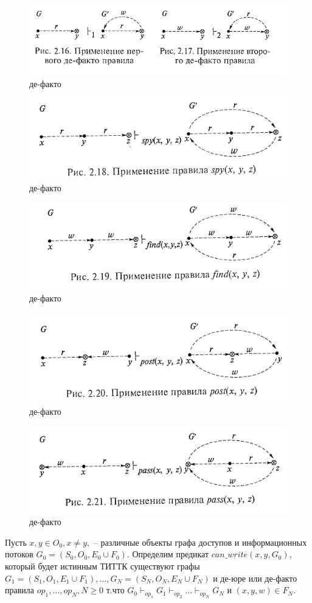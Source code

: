 \begin{figure}[H]
	\centering
	\includegraphics[width=0.5\linewidth]{img/3.png}
	\caption{де-факто}
\end{figure}

\begin{figure}[H]
	\centering
	\includegraphics[width=0.5\linewidth]{img/4.png}
	\caption{де-факто}
\end{figure}

\begin{figure}[H]
	\centering
	\includegraphics[width=0.5\linewidth]{img/5.png}
	\caption{де-факто}
\end{figure}

\begin{figure}[H]
	\centering
	\includegraphics[width=0.5\linewidth]{img/6.png}
	\caption{де-факто}
\end{figure}

\begin{figure}[H]
	\centering
	\includegraphics[width=0.5\linewidth]{img/7.png}
	\caption{де-факто}
\end{figure}

\begin{defs}
	Пусть $x, y \in O_0, x \neq y,$ -- различные объекты графа доступов и информационных потоков $G_0 = (S_0, O_0, E_0 \cup F_0).$
	Определим предикат $can\_write(x, y, G_0)$, который будет истинным ТИТТК существуют графы 
	$G_1 = (S_1, O_1, E_1 \cup F_1), \ldots, G_N = (S_N, O_N, E_N \cup F_N)$ и де-юре или де-факто правила
	$op_1, \ldots, op_N, N \geqslant 0 $ т.что $G_0 \vdash_{op_1} G_1 \vdash_{op_2} \ldots \vdash_{op_N} G_N$ 
	и $(x, y, w) \in F_N$.
\end{defs}

